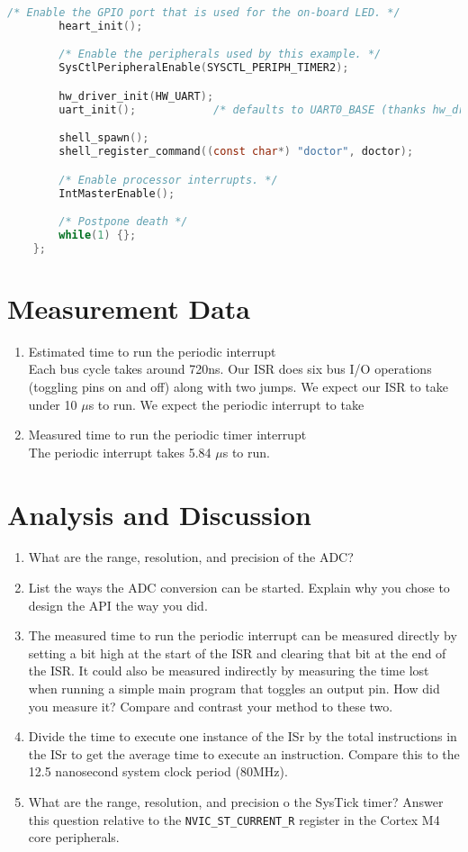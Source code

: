 \documentclass[12pt]{article}
\begin{document}
\begin{enumerate}[1)]
\begin{lstlisting}[language=C]
        /* Enable the GPIO port that is used for the on-board LED. */
        heart_init();

        /* Enable the peripherals used by this example. */
        SysCtlPeripheralEnable(SYSCTL_PERIPH_TIMER2);

        hw_driver_init(HW_UART);
        uart_init();            /* defaults to UART0_BASE (thanks hw_driver) */

        shell_spawn();
        shell_register_command((const char*) "doctor", doctor);

        /* Enable processor interrupts. */
        IntMasterEnable();

        /* Postpone death */
        while(1) {};
    };
  \end{lstlisting}
\end{enumerate}
\section{Measurement Data}
\begin{enumerate}[1)]
  \item Estimated time to run the periodic interrupt \\
    Each bus cycle takes around 720ns. Our ISR does six bus I/O
    operations (toggling pins on and off) along with two jumps. We
    expect our ISR to take under 10 $\mu$s to run.
    We expect the periodic interrupt to take
  \item Measured time to run the periodic timer interrupt \\
    The periodic interrupt takes 5.84 $\mu$s to run.
  \end{enumerate}
\section{Analysis and Discussion}
\begin{enumerate}[1)]
  \item What are the range, resolution, and precision of the ADC?
  \item List the ways the ADC conversion can be started. Explain why
    you chose to design the API the way you did.
  \item The measured time to run the periodic interrupt can be
    measured directly by setting a bit high at the start of the ISR
    and clearing that bit at the end of the ISR. It could also be
    measured indirectly by measuring the time lost when running a
    simple main program that toggles an output pin. How did you measure
    it? Compare and contrast your method to these two.
  \item Divide the time to execute one instance of the ISr by the
    total instructions in the ISr to get the average time to execute
    an instruction. Compare this to the 12.5 nanosecond system clock
    period (80MHz).
  \item What are the range, resolution, and precision o the SysTick
    timer? Answer this question relative to the
    \verb|NVIC_ST_CURRENT_R| register in the Cortex M4 core peripherals.
\end{enumerate}
\end{document}
